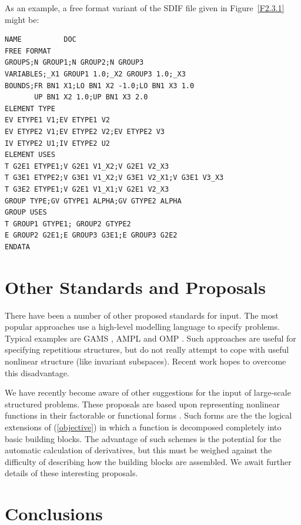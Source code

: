 \documentclass[a4paper]{article}
\newcommand{\req}[1]{(\ref{#1})}
\begin{document}
As an example, a free format
variant of the SDIF file given in Figure~\ref{F2.3.1} might be:
{\renewcommand{\arraystretch}{0.8} {\small {\tt \begin{verbatim}
NAME          DOC
FREE FORMAT
GROUPS;N GROUP1;N GROUP2;N GROUP3
VARIABLES;_X1 GROUP1 1.0;_X2 GROUP3 1.0;_X3
BOUNDS;FR BN1 X1;LO BN1 X2 -1.0;LO BN1 X3 1.0
       UP BN1 X2 1.0;UP BN1 X3 2.0
ELEMENT TYPE
EV ETYPE1 V1;EV ETYPE1 V2
EV ETYPE2 V1;EV ETYPE2 V2;EV ETYPE2 V3
IV ETYPE2 U1;IV ETYPE2 U2
ELEMENT USES
T G2E1 ETYPE1;V G2E1 V1_X2;V G2E1 V2_X3
T G3E1 ETYPE2;V G3E1 V1_X2;V G3E1 V2_X1;V G3E1 V3_X3
T G3E2 ETYPE1;V G2E1 V1_X1;V G2E1 V2_X3
GROUP TYPE;GV GTYPE1 ALPHA;GV GTYPE2 ALPHA
GROUP USES
T GROUP1 GTYPE1; GROUP2 GTYPE2
E GROUP2 G2E1;E GROUP3 G3E1;E GROUP3 G2E2
ENDATA
\end{verbatim} }}}

\section{\label{S6}Other Standards and Proposals}
\setcounter{figure}{0}

There have been a number of  other proposed  standards for input.  The
most popular approaches use a high-level modelling language
to specify problems. Typical examples are GAMS
\cite{GAMS88},  AMPL
\cite{FourGayKern87}
and OMP \cite{OMP87}.   Such  approaches are  useful  for  specifying
repetitious structures,
but do not really attempt  to cope with useful
nonlinear structure (like invariant subspaces).
Recent work \cite{FourGayKern89}  hopes   to overcome  this
disadvantage.

We have  recently become aware  of other suggestions for  the input of
large-scale   structured
problems. These  proposals   are based upon
representing nonlinear functions in  their factorable \cite{Lena89} or
functional forms \cite{McCoRahn89}.  Such forms   are the the  logical
extensions of \req{objective}    in which  a function  is   decomposed
completely into basic building blocks.  The  advantage of such schemes
is the  potential for the  automatic  calculation of  derivatives,
but this must be weighed against the difficulty  of describing how the
building  blocks are assembled.    We  await further details  of these
interesting proposals.

\section{\label{S7}Conclusions}
\setcounter{figure}{0}
\end{document}

